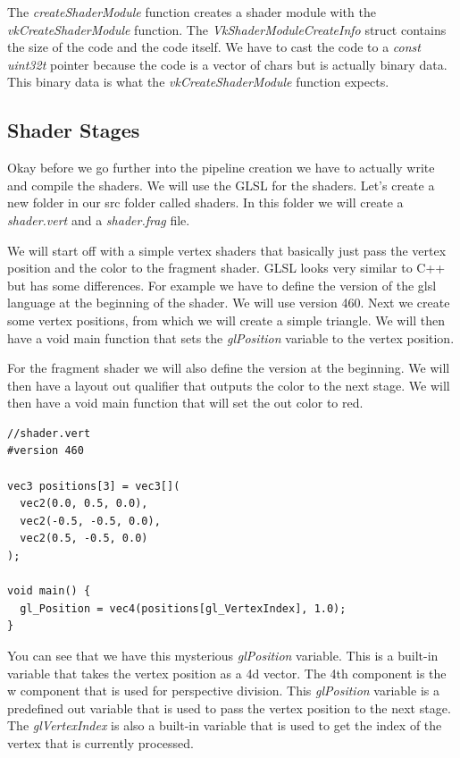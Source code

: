\documentclass[12pt]{report} \usepackage{preamble}
\begin{document}
The \textit{createShaderModule} function creates a shader module with the \textit{vkCreateShaderModule} function. The
\textit{VkShaderModuleCreateInfo} struct contains the size of the code and the code itself. We have to cast the code to
a \textit{const uint32\textunderscore t} pointer because the code is a vector of chars but is actually binary data.
This binary data is what the \textit{vkCreateShaderModule} function expects.

\subsection{Shader Stages}

Okay before we go further into the pipeline creation we have to actually write and compile the shaders. We will use the
\ac{GLSL} for the shaders. Let's create a new folder in our src folder called shaders. In this folder we will create
a \textit{shader.vert} and a \textit{shader.frag} file.

We will start off with a simple vertex shaders that basically just pass the vertex position and the color to the fragment shader.
\ac{GLSL} looks very similar to C++ but has some differences. For example we have to define the version of the glsl language
at the beginning of the shader. We will use version 460. Next we create some vertex positions, from which we will create a simple triangle.
We will then have a void main function that sets the \textit{gl\textunderscore Position} variable to the vertex position.

For the fragment shader we will also define the version at the beginning. We will then have a layout out qualifier that outputs the
color to the next stage. We will then have a void main function that will set the out color to red.

\begin{lstlisting}[Language=C++]
//shader.vert
#version 460

vec3 positions[3] = vec3[](
  vec2(0.0, 0.5, 0.0),
  vec2(-0.5, -0.5, 0.0),
  vec2(0.5, -0.5, 0.0)
);

void main() {
  gl_Position = vec4(positions[gl_VertexIndex], 1.0);
}
\end{lstlisting}

You can see that we have this mysterious \textit{gl\textunderscore Position} variable. This is a built-in variable that
takes the vertex position as a 4d vector. The 4th component is the w component that is used for perspective division.
This \textit{gl\textunderscore Position} variable is a predefined out variable that is used to pass the vertex position
to the next stage. The \textit{gl\textunderscore VertexIndex} is also a built-in variable that is used to get the index
of the vertex that is currently processed.
\end{document}
